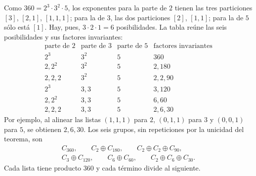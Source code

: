 \begin{ejem}
Como $360=2^3\cdot3^2\cdot5$, los exponentes para la parte de $2$ tienen las tres particiones $[3]$, $[2,1]$, $[1,1,1]$; para la de $3$, las dos particiones $[2]$, $[1,1]$; para la de $5$ sólo está $[1]$. Hay, pues, $3\cdot2\cdot1=6$ posibilidades. La tabla reúne las seis posibilidades y sus factores invariantes:
\begingroup
\renewcommand{\arraystretch}{1.2}
\[
\begin{array}{c|c|c|c}
\text{parte de }2&\text{parte de }3&\text{parte de }5&\text{factores invariantes}\\[2pt]\hline
2^3&3^2&5&360\\
2,2^2&3^2&5&2,180\\
2,2,2&3^2&5&2,2,90\\
2^3&3,3&5&3,120\\
2,2^2&3,3&5&6,60\\
2,2,2&3,3&5&2,6,30
\end{array}
\]
\endgroup
Por ejemplo, al alinear las listas $(1,1,1)$ para $2$, $(0,1,1)$ para $3$ y $(0,0,1)$ para $5$, se obtienen $2,6,30$. Los seis grupos, sin repeticiones por la unicidad del teorema, son
\begin{gather*}
C_{360},\qquad C_2\oplus C_{180},\qquad C_2\oplus C_2\oplus C_{90},\\
C_3\oplus C_{120},\qquad C_6\oplus C_{60},\qquad C_2\oplus C_6\oplus C_{30}.
\end{gather*}
Cada lista tiene producto $360$ y cada término divide al siguiente.
\end{ejem}
